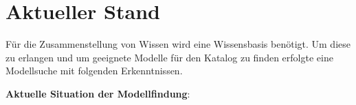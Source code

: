 \section{Aktueller Stand}
\label{Ch:Vorbetrachtung:Sec:CurrentState}
Für die Zusammenstellung von Wissen wird eine Wissensbasis benötigt. Um diese zu erlangen und um geeignete Modelle für den Katalog zu finden erfolgte eine Modellsuche mit folgenden Erkenntnissen.

\textbf{Aktuelle Situation der Modellfindung}: 
